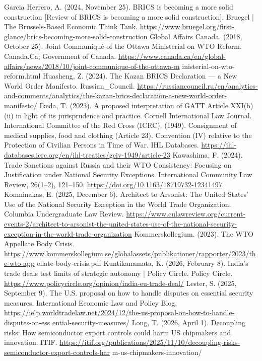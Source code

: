 \begin{referencelist}
   Garcia Herrero, A. (2024, November 25). BRICS is becoming a more solid construction [Review of BRICS is becoming a more solid construction]. Bruegel | The Brussels-Based Economic Think Tank. \url{https://www.bruegel.org/first-glance/brics-becoming-more-solid-construction}
   Global Affairs Canada. (2018, October 25). Joint Communiqué of the Ottawa Ministerial on WTO Reform. Canada.Ca; Government of Canada. \url{https://www.canada.ca/en/global-affairs/news/2018/10/joint-communique-of-the-ottawa-m} inisterial-on-wto-reform.html Huasheng, Z. (2024). The Kazan BRICS Declaration — a New World Order Manifesto. Russian\_Council. \url{https://russiancouncil.ru/en/analytics-and-comments/analytics/the-kazan-brics-declaration-a-new-world-order-manifesto/}
   Ikeda, T. (2023). A proposed interpretation of GATT Article XXI(b)(ii) in light of its jurisprudence and practice. Cornell International Law Journal.
   International Committee of the Red Cross (ICRC). (1949). Consignment of medical supplies, food and clothing (Article 23). Convention (IV) relative to the Protection of Civilian Persons in Time of War. IHL Databases. \url{https://ihl-databases.icrc.org/en/ihl-treaties/gciv-1949/article-23}
   Kawashima, F. (2024). Trade Sanctions against Russia and their WTO Consistency: Focusing on Justification under National Security Exceptions. International Community Law Review, 26(1–2), 121–150. \url{https://doi.org/10.1163/18719732-12341497}
   Komninakas, E. (2025, December 6). Architect to Arsonist: The United States’ Use of the National Security Exception in the World Trade Organization. Columbia Undergraduate Law Review. \url{https://www.culawreview.org/current-events-2/architect-to-arsonist-the-united-states-use-of-the-national-security-exception-in-the-world-trade-organization}
   Kommerskollegium. (2023). The WTO Appellate Body Crisis. \url{https://www.kommerskollegium.se/globalassets/publikationer/rapporter/2023/the-wto-app} ellate-body-crisis.pdf
   Kuntikanamata, K. (2026, February 8). India’s trade deals test limits of strategic autonomy | Policy Circle. Policy Circle. \url{https://www.policycircle.org/opinion/india-eu-trade-deal/}
   Lester, S. (2025, September 9). The U.S. proposal on how to handle disputes on essential security measures. International Economic Law and Policy Blog. \url{https://ielp.worldtradelaw.net/2024/12/the-us-proposal-on-how-to-handle-disputes-on-ess} ential-security-measures/
   Long, T. (2026, April 1). Decoupling risks: How semiconductor export controls could harm US chipmakers and innovation. ITIF. \url{https://itif.org/publications/2025/11/10/decoupling-risks-semiconductor-export-controls-har} m-us-chipmakers-innovation/

\end{referencelist}
